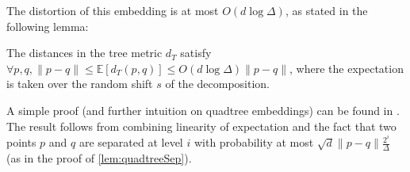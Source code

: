 The distortion of this embedding is at most $O(d \log \Delta)$, as stated in the following lemma:
\begin{lemma}\label{lem:quadtreeDist}
The distances in the tree metric $d_T$ satisfy
$\forall p,q, \|p-q\| \leq \mathbb{E}[d_T(p, q)] \leq O(d \log \Delta) \|p-q\|$, where the expectation is taken over the random shift $s$ of the decomposition.
\end{lemma}

A simple proof (and further intuition on quadtree embeddings) can be found in \cite{har2011geometric}. The result follows from combining linearity
of expectation and the fact that two points $p$ and $q$ are separated at level $i$ with probability at most $\sqrt{d} \|p-q\| \frac{2^i}{\Delta}$ (as in the
proof of \cref{lem:quadtreeSep}).
